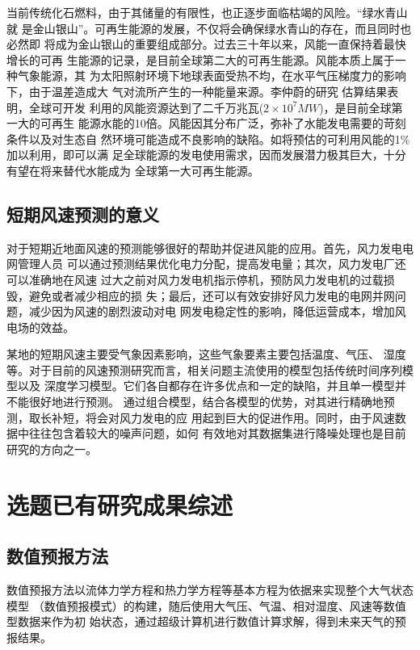 \documentclass[AutoFakeBold]{LZUThesis}
\begin{document}
当前传统化石燃料，由于其储量的有限性，也正逐步面临枯竭的风险。“绿水青山就
是金山银山”。可再生能源的发展，不仅将会确保绿水青山的存在，而且同时也必然即
将成为金山银山的重要组成部分。过去三十年以来，风能一直保持着最快增长的可再
生能源的记录，是目前全球第二大的可再生能源。风能本质上属于一种气象能源，其
为太阳照射环境下地球表面受热不均，在水平气压梯度力的影响下，由于温差造成大
气对流所产生的一种能量来源。李仲蔚的研究
估算结果表明，全球可开发
利用的风能资源达到了二千万兆瓦($2\times10^7MW$)，是目前全球第一大的可再生
能源水能的10倍。风能因其分布广泛，弥补了水能发电需要的苛刻条件以及对生态自
然环境可能造成不良影响的缺陷。如将预估的可利用风能的1\%加以利用，即可以满
足全球能源的发电使用需求，因而发展潜力极其巨大，十分有望在将来替代水能成为
全球第一大可再生能源。

\subsection{短期风速预测的意义}
对于短期近地面风速的预测能够很好的帮助并促进风能的应用。首先，风力发电电网管理人员
可以通过预测结果优化电力分配，提高发电量；其次，风力发电厂还可以准确地在风速
过大之前对风力发电机指示停机，预防风力发电机的过载损毁，避免或者减少相应的损
失；最后，还可以有效安排好风力发电的电网并网问题，减少因为风速的剧烈波动对电
网发电稳定性的影响，降低运营成本，增加风电场的效益。

某地的短期风速主要受气象因素影响，这些气象要素主要包括温度、气压、
湿度等。对于目前的风速预测研究而言，相关问题主流使用的模型包括传统时间序列模型以及
深度学习模型。它们各自都存在许多优点和一定的缺陷，并且单一模型并不能很好地进行预测。
通过组合模型，结合各模型的优势，对其进行精确地预测，取长补短，将会对风力发电的应
用起到巨大的促进作用。同时，由于风速数据中往往包含着较大的噪声问题，如何
有效地对其数据集进行降噪处理也是目前研究的方向之一。

\section{选题已有研究成果综述}
\subsection{数值预报方法}
数值预报方法以流体力学方程和热力学方程等基本方程为依据来实现整个大气状态模型
（数值预报模式）的构建，随后使用大气压、气温、相对湿度、风速等数值型数据来作为初
始状态，通过超级计算机进行数值计算求解，得到未来天气的预报结果。
\end{document}
